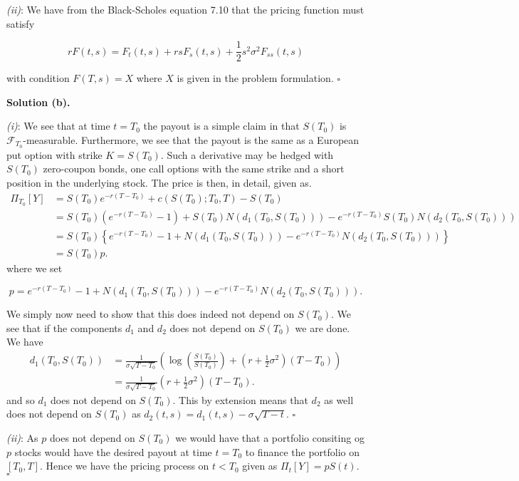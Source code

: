 \documentclass[a4paper,12pt,openany]{book}
\begin{document}
\emph{(ii)}: We have from the Black-Scholes equation 7.10 that the pricing function must satisfy

\[
rF(t,s)=F_t(t,s)+rsF_s(t,s)+\frac{1}{2}s^2\sigma^2 F_{ss}(t,s)
\]

with condition \(F(T,s)=X\) where \(X\) is given in the problem formulation. \(\square\)

\noindent\makebox[\linewidth]{\rule{\textwidth}{0.4pt}}

\textbf{Solution (b).}

\emph{(i)}: We see that at time \(t=T_0\) the payout is a simple claim in that \(S(T_0)\) is \(\mathcal{F}_{T_0}\)-measurable. Furthermore, we see that the payout is the same as a European put option with strike \(K=S(T_0)\). Such a derivative may be hedged with \(S(T_0)\) zero-coupon bonds, one call options with the same strike and a short position in the underlying stock. The price is then, in detail, given as.
\begin{align*}
\Pi_{T_0}[Y]&=S(T_0)e^{-r(T-T_0)}+c(S(T_0);T_0,T)-S(T_0)\\
&=S(T_0)\left(e^{-r(T-T_0)}-1\right)+S(T_0)N(d_1(T_0,S(T_0)))-e^{-r(T-T_0)}S(T_0)N(d_2(T_0,S(T_0)))\\
&=S(T_0)\left\{e^{-r(T-T_0)}-1+N(d_1(T_0,S(T_0)))-e^{-r(T-T_0)}N(d_2(T_0,S(T_0)))\right\}\\
&=S(T_0)p.
\end{align*}
where we set

\[
p=e^{-r(T-T_0)}-1+N(d_1(T_0,S(T_0)))-e^{-r(T-T_0)}N(d_2(T_0,S(T_0))).
\]

We simply now need to show that this does indeed not depend on \(S(T_0)\). We see that if the components \(d_1\) and \(d_2\) does not depend on \(S(T_0)\) we are done. We have
\begin{align*}
d_1(T_0,S(T_0))&=\frac{1}{\sigma\sqrt{T-T_0}}\left(\log\left(\frac{S(T_0)}{S(T_0)}\right)+\left(r+\frac{1}{2}\sigma^2\right)(T-T_0)\right)\\
&=\frac{1}{\sigma\sqrt{T-T_0}}\left(r+\frac{1}{2}\sigma^2\right)(T-T_0).
\end{align*}
and so \(d_1\) does not depend on \(S(T_0)\). This by extension means that \(d_2\) as well does not depend on \(S(T_0)\) as \(d_2(t,s)=d_1(t,s)-\sigma\sqrt{T-t}\). \(\square\)

\emph{(ii)}: As \(p\) does not depend on \(S(T_0)\) we would have that a portfolio consiting og \(p\) stocks would have the desired payout at time \(t=T_0\) to finance the portfolio on \([T_0,T]\). Hence we have the pricing process on \(t<T_0\) given as \(\Pi_t[Y]=pS(t)\). \(\square\)
\end{document}
